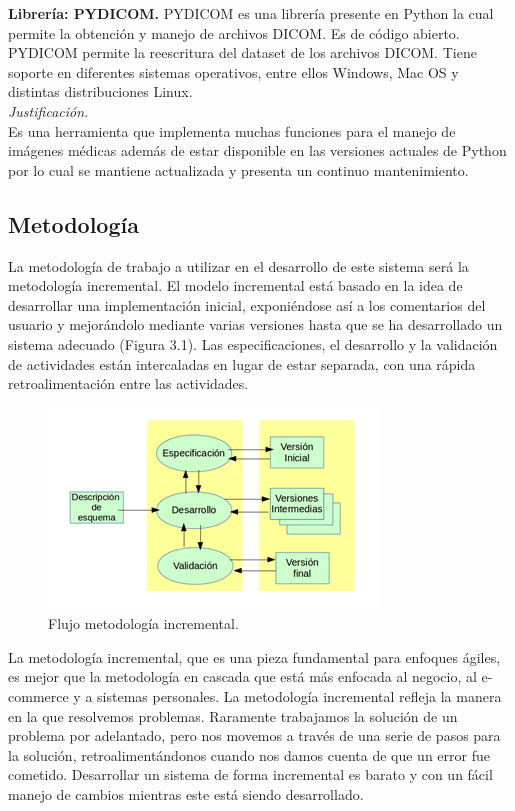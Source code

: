 \documentclass[12pt]{report}
\begin{document}
\textbf{Librería: PYDICOM. }
PYDICOM es una librería presente en Python la cual permite la obtención y manejo de archivos DICOM. Es de código abierto. PYDICOM permite la reescritura del dataset de los archivos DICOM. Tiene soporte en diferentes sistemas operativos, entre ellos Windows, Mac OS y distintas distribuciones Linux.\\

\textit{Justificación.}\\ Es una herramienta que implementa muchas funciones para el manejo de imágenes médicas además de estar disponible en las versiones actuales de Python por lo cual se mantiene actualizada y presenta un continuo mantenimiento.

\subsection{Metodología}
La metodología de trabajo a utilizar en el desarrollo de este sistema será la metodología incremental. El modelo incremental está basado en la idea de desarrollar una implementación inicial, exponiéndose así a los comentarios del usuario y mejorándolo mediante varias versiones hasta que se ha desarrollado un sistema adecuado (Figura 3.1). Las especificaciones, el desarrollo y la validación de actividades están intercaladas en lugar de estar separada, con una rápida retroalimentación entre las actividades.\cite{meto}

\begin{figure}[H]
\centering
\includegraphics[width = 12 cm, height = 7 cm]{incre}
\caption{Flujo metodología incremental.}
\end{figure}

La metodología incremental, que es una pieza fundamental para enfoques ágiles, es mejor que la metodología en cascada que está más enfocada al negocio, al e-commerce y a sistemas personales. La metodología incremental refleja la manera en la que resolvemos problemas. Raramente trabajamos la solución de un problema por adelantado, pero nos movemos a través de una serie de pasos para la solución, retroalimentándonos cuando nos damos cuenta de que un error fue cometido. Desarrollar un sistema de forma incremental es barato y con un fácil manejo de cambios mientras este está siendo desarrollado.\cite{meto}\\
\end{document}

